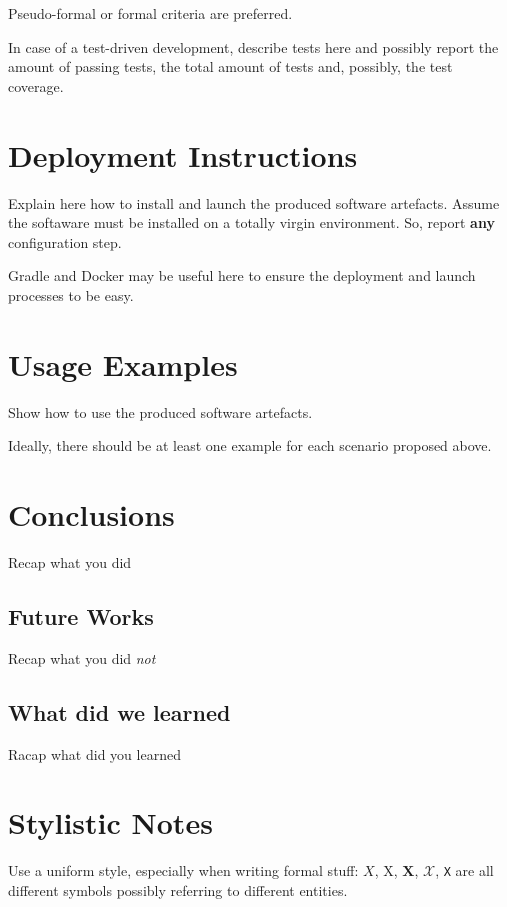 \documentclass{scrartcl}
\begin{document}
    Pseudo-formal or formal criteria are preferred.

    In case of a test-driven development, describe tests here and possibly report the amount of passing tests, the total amount of tests and, possibly, the test coverage.


    \section{Deployment Instructions}

    Explain here how to install and launch the produced software artefacts.
%
    Assume the softaware must be installed on a totally virgin environment.
%
    So, report \textbf{any} configuration step.

    Gradle and Docker may be useful here to ensure the deployment and launch processes to be easy.


    \section{Usage Examples}

    Show how to use the produced software artefacts.

    Ideally, there should be at least one example for each scenario proposed above.


    \section{Conclusions}

    Recap what you did

    \subsection{Future Works}

    Recap what you did \emph{not}

    \subsection{What did we learned}

    Racap what did you learned

    \section*{Stylistic Notes}

    Use a uniform style, especially when writing formal stuff: $X$, X, $\mathbf{X}$, $\mathcal{X}$, \texttt{X} are all different symbols possibly referring to different entities.
\end{document}
